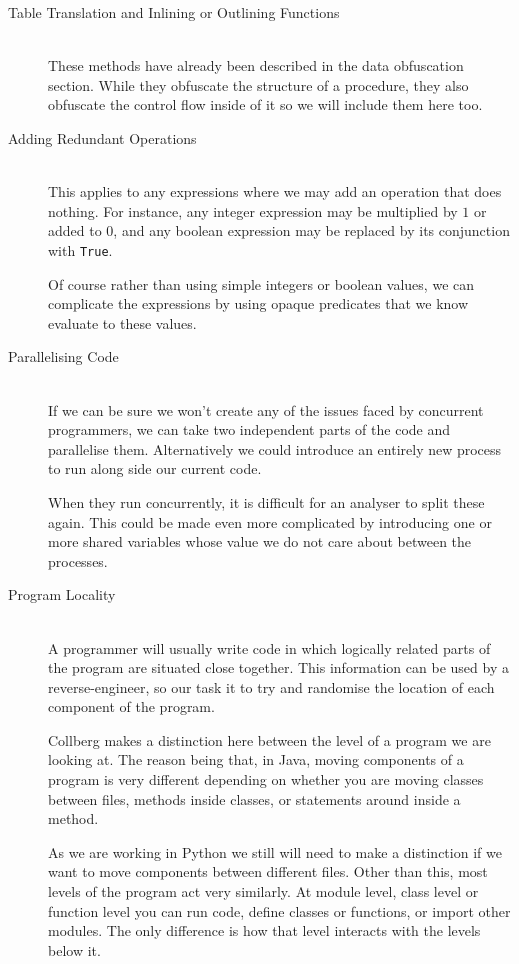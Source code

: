 \documentclass[twoside,a4paper]{report}
\begin{document}
\begin{description}
\item[Table Translation and Inlining or Outlining Functions] \hfill \\
These methods have already been described in the data obfuscation section. While they obfuscate the structure of a procedure,
they also obfuscate the control flow inside of it so we will include them here too.

\item[Adding Redundant Operations] \hfill \\
This applies to any expressions where we may add an operation that does nothing. For instance, any integer expression may
be multiplied by $1$ or added to $0$, and any boolean expression may be replaced by its conjunction with \texttt{True}.

Of course rather than using simple integers or boolean values, we can complicate the expressions by using opaque predicates
that we know evaluate to these values.

\item[Parallelising Code] \hfill \\
If we can be sure we won't create any of the issues faced by concurrent programmers, we can take two independent parts of
the code and parallelise them. Alternatively we could introduce an entirely new process to run along side our current code.

When they run concurrently, it is difficult for an analyser to split these again. This could be made even more complicated
by introducing one or more shared variables whose value we do not care about between the processes.

\item[Program Locality] \hfill \\
A programmer will usually write code in which logically related parts of the program are situated close together. This information
can be used by a reverse-engineer, so our task it to try and randomise the location of each component of the program.

Collberg makes a distinction here between the level of a program we are looking at. The reason being that, in Java, moving components of
a program is very different depending on whether you are moving classes between files, methods inside classes, or statements around
inside a method.

As we are working in Python we still will need to make a distinction if we want to move components between different files. Other
than this, most levels of the program act very similarly. At module level, class level or function level you can run code, define
classes or functions, or import other modules. The only difference is how that level interacts with the levels below it.

\end{description}
\end{document}
